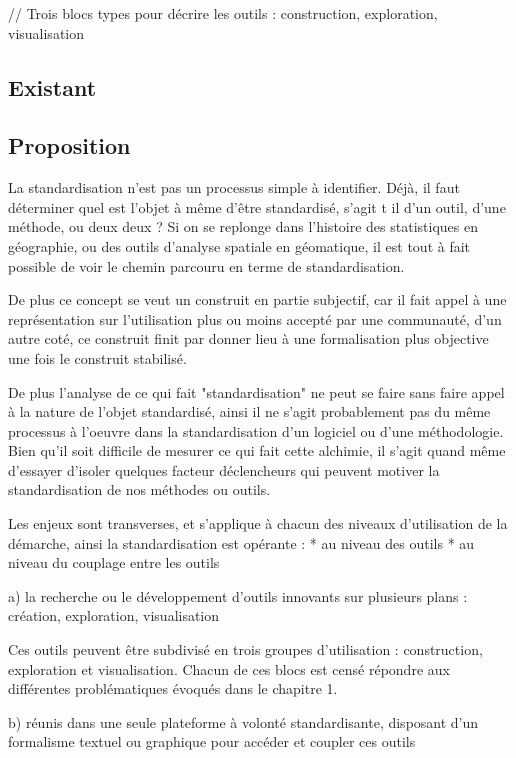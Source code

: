 // Trois blocs types pour décrire les outils : construction, exploration, visualisation

\subsection{Existant}

\subsection{Proposition}

La standardisation n'est pas un processus simple à identifier.
Déjà, il faut déterminer quel est l'objet à même d'être standardisé, s'agit t il d'un outil, d'une méthode, ou deux deux ?
Si on se replonge dans l'histoire des statistiques en géographie, ou des outils d'analyse spatiale en géomatique, il est tout à fait possible de voir le chemin parcouru en terme de standardisation. 

De plus ce concept se veut un construit en partie subjectif, car il fait appel à une représentation sur l'utilisation plus ou moins accepté par une communauté, d'un autre coté, ce construit finit par donner lieu à une formalisation plus objective une fois le construit stabilisé.  

De plus l'analyse de ce qui fait "standardisation" ne peut se faire sans faire appel à la nature de l'objet standardisé, ainsi il ne s'agit probablement pas du même processus à l'oeuvre dans la standardisation d'un logiciel ou d'une méthodologie. Bien qu'il soit difficile de mesurer ce qui fait cette alchimie, il s'agit quand même d'essayer d'isoler quelques facteur déclencheurs qui peuvent motiver la standardisation de nos méthodes ou outils.

Les enjeux sont transverses, et s'applique à chacun des niveaux d'utilisation de la démarche, ainsi la standardisation est opérante :
* au niveau des outils
* au niveau du couplage entre les outils

a) la recherche ou le développement d'outils innovants sur plusieurs plans : création, exploration, visualisation

Ces outils peuvent être subdivisé en trois groupes d'utilisation : construction, exploration et visualisation. Chacun de ces blocs est censé répondre aux différentes problématiques évoqués dans le chapitre 1.

b) réunis dans une seule plateforme à volonté standardisante,  disposant d'un formalisme textuel ou graphique pour accéder et coupler ces outils 

